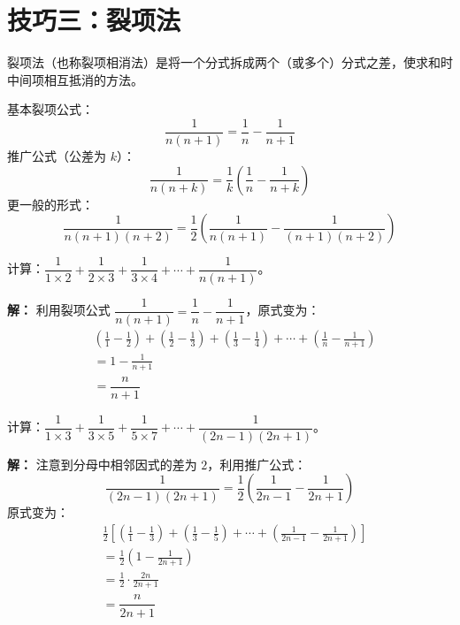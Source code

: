\documentclass[12pt, a4paper]{ctexart}
\begin{document}
\section*{\textcolor{mainblue}{技巧三：裂项法}}

\begin{knowledgebox}[裂项法的核心思想]
裂项法（也称裂项相消法）是将一个分式拆成两个（或多个）分式之差，使求和时中间项相互抵消的方法。

基本裂项公式：
\[
\frac{1}{n(n+1)} = \frac{1}{n} - \frac{1}{n+1}
\]
推广公式（公差为 $k$）：
\[
\frac{1}{n(n+k)} = \frac{1}{k}\left(\frac{1}{n} - \frac{1}{n+k}\right)
\]
更一般的形式：
\[
\frac{1}{n(n+1)(n+2)} = \frac{1}{2}\left(\frac{1}{n(n+1)} - \frac{1}{(n+1)(n+2)}\right)
\]
\end{knowledgebox}

\begin{examplebox}[【例6】裂项法求和]
计算：$\dfrac{1}{1\times2} + \dfrac{1}{2\times3} + \dfrac{1}{3\times4} + \cdots + \dfrac{1}{n(n+1)}$。
\end{examplebox}

\textbf{解：} 利用裂项公式 $\dfrac{1}{n(n+1)} = \dfrac{1}{n} - \dfrac{1}{n+1}$，原式变为：
\begin{align*}
&\left(\frac{1}{1} - \frac{1}{2}\right) + \left(\frac{1}{2} - \frac{1}{3}\right) + \left(\frac{1}{3} - \frac{1}{4}\right) + \cdots + \left(\frac{1}{n} - \frac{1}{n+1}\right) \\
&= 1 - \frac{1}{n+1} \\
&= \boxed{\dfrac{n}{n+1}}
\end{align*}

\begin{examplebox}
计算：$\dfrac{1}{1\times3} + \dfrac{1}{3\times5} + \dfrac{1}{5\times7} + \cdots + \dfrac{1}{(2n-1)(2n+1)}$。
\end{examplebox}

\textbf{解：} 注意到分母中相邻因式的差为 $2$，利用推广公式：
\[
\frac{1}{(2n-1)(2n+1)} = \frac{1}{2}\left(\frac{1}{2n-1} - \frac{1}{2n+1}\right)
\]
原式变为：
\begin{align*}
&\frac{1}{2}\left[\left(\frac{1}{1} - \frac{1}{3}\right) + \left(\frac{1}{3} - \frac{1}{5}\right) + \cdots + \left(\frac{1}{2n-1} - \frac{1}{2n+1}\right)\right] \\
&= \frac{1}{2}\left(1 - \frac{1}{2n+1}\right) \\
&= \frac{1}{2} \cdot \frac{2n}{2n+1} \\
&= \boxed{\dfrac{n}{2n+1}}
\end{align*}
\end{document}
